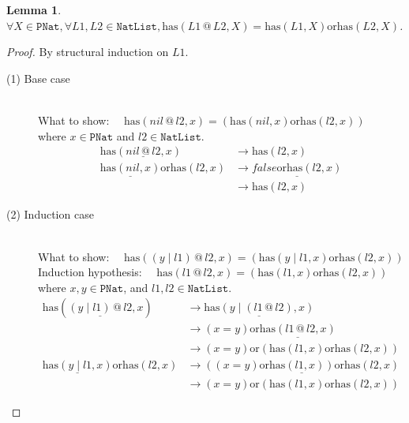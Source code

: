 \documentclass[12pt, a4paper]{article}
\newtheorem{lemma}[theorem]{Lemma}
\newcommand{\rel}[1]{\mathrel{#1}}
\newcommand{\rmx}[1]{\mathrm{#1}}
\newcommand{\larrow}{\longrightarrow}
\newcommand{\under}{\underline}
\begin{document}
\begin{lemma}
\label{lm1}
$\forall X \in \mathtt{PNat}, \forall L1, L2 \in \mathtt{NatList}, \rmx{has}(L1 \rel{@} L2, X) = \rmx{has}(L1, X) \rel{\rmx{or}} \rmx{has}(L2, X)$.
\end{lemma}
\begin{proof}
By structural induction on $L1$.

\begin{description}

\item[(1) Base case]~\\
\noindent
What to show: $\quad \rmx{has}(nil \rel{@} l2, x) = (\rmx{has}(nil, x) \rel{\rmx{or}} \rmx{has}(l2, x))$ \\
where $x \in \mathtt{PNat}$ and $l2 \in \mathtt{NatList}$.
\begin{align*}
\rmx{has}(\under{nil \rel{@} l2}, x)
	&\larrow \rmx{has}(l2, x) \tag{by @1} \\
\under{\rmx{has}(nil, x)} \rel{\rmx{or}} \rmx{has}(l2, x)
	&\larrow \under{false \rel{\rmx{or}} \rmx{has}(l2, x)} \tag{by has1} \\
	&\larrow \rmx{has}(l2, x) \tag{by or}
\end{align*}

\item[(2) Induction case]~\\
What to show: $\quad \rmx{has}((y \rel{|} l1) \rel{@} l2, x) = (\rmx{has}(y \rel{|} l1, x) \rel{\rmx{or}} \rmx{has}(l2, x))$ \\
Induction hypothesis: $\quad \rmx{has}(l1 \rel{@} l2, x) = (\rmx{has}(l1, x) \rel{\rmx{or}} \rmx{has}(l2, x))$  \\
where $x, y \in \mathtt{PNat}$, and $l1, l2 \in \mathtt{NatList}$.
\begin{align*}
\rmx{has}(\under{(y \rel{|} l1) \rel{@} l2}, x)
	&\larrow \under{\rmx{has}(y \rel{|} (l1 \rel{@} l2), x)} \tag{by @2} \\
	&\larrow (x = y) \rel{\rmx{or}} \under{\rmx{has}(l1 \rel{@} l2, x)} \tag{by has2} \\
	&\larrow (x = y) \rel{\rmx{or}} (\rmx{has}(l1, x) \rel{\rmx{or}} \rmx{has}(l2, x)) \tag{by IH} \\
\under{\rmx{has}(y \rel{|} l1, x)} \rel{\rmx{or}} \rmx{has}(l2, x)
	&\larrow \under{((x = y) \rel{\rmx{or}} \rmx{has}(l1, x)) \rel{\rmx{or}} \rmx{has}(l2, x)} \tag{by has2} \\
	&\larrow (x = y) \rel{\rmx{or}} (\rmx{has}(l1, x) \rel{\rmx{or}} \rmx{has}(l2, x)) \tag{by assoc-or}
\end{align*}

\end{description}
\end{proof}
\end{document}

